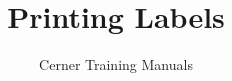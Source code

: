 

\title{Printing Labels} %
\author{Cerner Training Manuals}



    \frontmatter
        \maketitle %
        \begin{fullwidth}
            \tableofcontents
        \end{fullwidth}

    \mainmatter
        

    \backmatter



